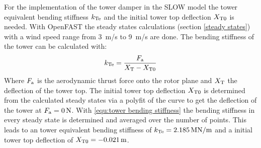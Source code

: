 For the implementation of the tower damper in the SLOW model the tower equivalent bending stiffness $k_\textnormal{Te}$ and the initial tower top deflection $X_\textnormal{T0}$ is needed. 
With OpenFAST the steady states calculations (section \ref{steady states}) with a wind speed range from \SI{3}{m/s} to \SI{9}{m/s} are done.
The bending stiffness of the tower can be calculated with: 
\begin{equation}
	k_{\textnormal{Te}} = \frac{F_\textnormal{a}}{X_\textnormal{T} - X_{\textnormal{T0}}}
	\label{equ:tower bending stiffness}
\end{equation}
Where $F_\textnormal{a}$ is the aerodynamic thrust force onto the rotor plane and $X_\textnormal{T}$ the deflection of the tower top.
The initial tower top deflection $X_\textnormal{T0}$ is determined from the calculated steady states via a polyfit of the curve to get the deflection of the tower at $F_\textnormal{a} = \SI{0}{N}$.
With \ref{equ:tower bending stiffness} the bending stiffness in every steady state is determined and averaged over the number of points. 
This leads to an tower equivalent bending stiffness of $k_\textnormal{Te} = \SI{2.185}{\mega \newton /\meter}$ and a initial tower top deflection of $X_\textnormal{T0} = \SI{-0.021}{m}$.
